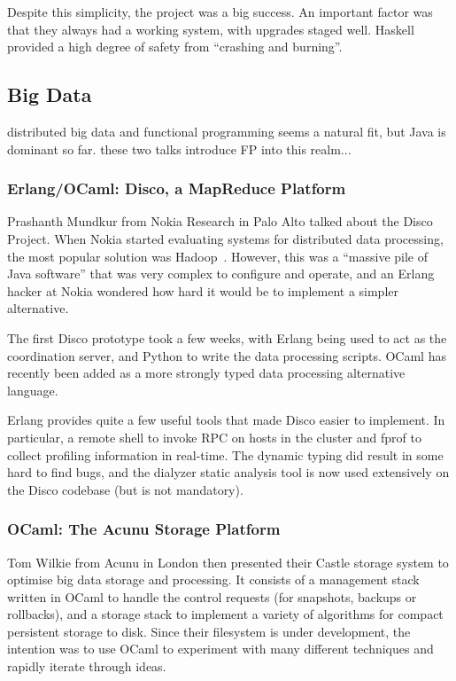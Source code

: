 \documentclass{jfp1}
\begin{document}
Despite this simplicity, the project was a big success. An important factor was that 
they always had a working system, with upgrades staged well. Haskell provided a high
degree of safety from ``crashing and burning''.

\subsection{Big Data}

distributed big data and functional programming seems a natural fit, but Java is dominant so far. these two talks introduce FP into this realm...

\subsubsection{Erlang/OCaml: Disco, a MapReduce Platform}

Prashanth Mundkur from Nokia Research in Palo Alto talked about the Disco Project.  When Nokia started evaluating systems for distributed data processing, the most popular solution was Hadoop~\cite{x}. However, this was a ``massive pile of Java software'' that was very complex to configure and operate, and an Erlang hacker at Nokia wondered how hard it would be to implement a simpler alternative.

The first Disco prototype took a few weeks, with Erlang being used to act as the coordination server, and Python to write the data processing scripts. OCaml has recently been added as a more strongly typed data processing alternative language.

Erlang provides quite a few useful tools that made Disco easier to implement. In particular, a remote shell to invoke RPC on hosts in the cluster and fprof to collect profiling information in real-time. The dynamic typing did result in some hard to find bugs, and the dialyzer static analysis tool is now used extensively on the Disco codebase (but is not mandatory).

\subsubsection{OCaml: The Acunu Storage Platform}

Tom Wilkie from Acunu in London then presented their Castle storage system to
optimise big data storage and processing.  It consists of a management stack
written in OCaml to handle the control requests (for snapshots, backups or
rollbacks), and a storage stack to implement a variety of algorithms for
compact persistent storage to disk.  Since their filesystem is under
development, the intention was to use OCaml to experiment with many different
techniques and rapidly iterate through ideas.
\end{document}
